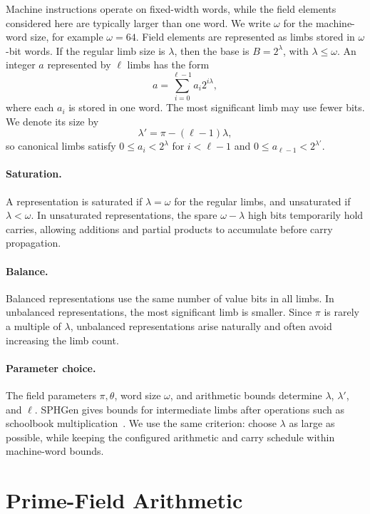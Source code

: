 Machine instructions operate on fixed-width words, while the field elements considered here are typically larger than one word. We write \(\omega\) for the machine-word size, for example \(\omega=64\). Field elements are represented as limbs stored in \(\omega\)-bit words. If the regular limb size is \(\lambda\), then the base is \(B=2^\lambda\), with \(\lambda \leq \omega\). An integer \(a\) represented by \(\ell\) limbs has the form
\[
    a = \sum_{i=0}^{\ell-1} a_i 2^{i\lambda},
\]
where each \(a_i\) is stored in one word. The most significant limb may use fewer bits. We denote its size by
\[
    \lambda' = \pi - (\ell-1)\lambda,
\]
so canonical limbs satisfy \(0 \leq a_i < 2^\lambda\) for \(i<\ell-1\) and \(0 \leq a_{\ell-1} < 2^{\lambda'}\).

\paragraph{Saturation.}
A representation is saturated if \(\lambda=\omega\) for the regular limbs, and unsaturated if \(\lambda<\omega\). In unsaturated representations, the spare \(\omega-\lambda\) high bits temporarily hold carries, allowing additions and partial products to accumulate before carry propagation.

\paragraph{Balance.}
Balanced representations use the same number of value bits in all limbs. In unbalanced representations, the most significant limb is smaller. Since \(\pi\) is rarely a multiple of \(\lambda\), unbalanced representations arise naturally and often avoid increasing the limb count.

\paragraph{Parameter choice.}
The field parameters \(\pi,\theta\), word size \(\omega\), and arithmetic bounds determine \(\lambda\), \(\lambda'\), and \(\ell\). SPHGen gives bounds for intermediate limbs after operations such as schoolbook multiplication~\cite{pegolotti2026sphgen}. We use the same criterion: choose \(\lambda\) as large as possible, while keeping the configured arithmetic and carry schedule within machine-word bounds.

\section{Prime-Field Arithmetic}
\label{sec:prime-field-arithmetic}

